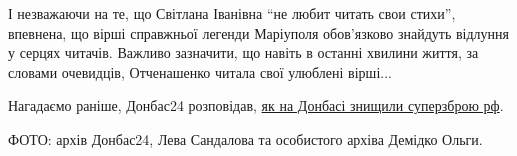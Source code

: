І незважаючи на те, що Світлана Іванівна \enquote{не любит читать свои стихи},
впевнена, що вірші справжньої легенди Маріуполя обов'язково знайдуть відлуння у
серцях читачів. Важливо зазначити, що навіть в останні хвилини життя, за
словами очевидців, Отченашенко читала свої улюблені вірші...


Нагадаємо раніше, Донбас24 розповідав,
\href{https://donbas24.news/news/na-donbasi-znishhili-superzbroyu-rf}{як на
Донбасі знищили суперзброю рф}.

ФОТО: архів Донбас24, Лева Сандалова та особистого архіва Демідко Ольги.

\clearpage
{}

